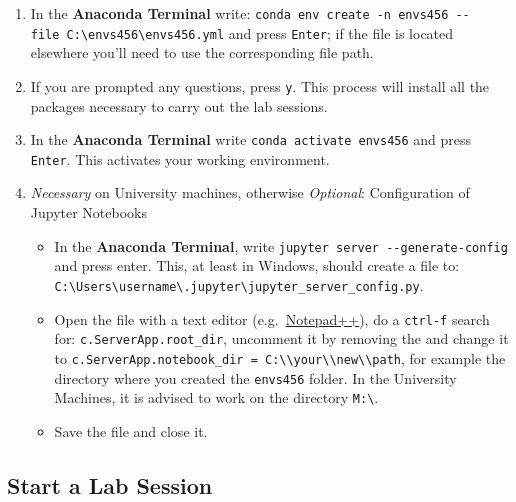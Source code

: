 \documentclass[
  letterpaper,
  DIV=11,
  numbers=noendperiod]{scrreprt}
\providecommand{\tightlist}{%
  \setlength{\itemsep}{0pt}\setlength{\parskip}{0pt}}\usepackage{longtable,booktabs,array}
\begin{document}
\begin{enumerate}
\def\labelenumi{\arabic{enumi}.}
\setcounter{enumi}{2}
\tightlist
\item
  In the \textbf{Anaconda Terminal} write:
  \texttt{conda\ env\ create\ -n\ envs456\ -\/-file\ C:\textbackslash{}envs456\textbackslash{}envs456.yml}
  and press \texttt{Enter}; if the file is located elsewhere you'll need
  to use the corresponding file path.
\item
  If you are prompted any questions, press \texttt{y}. This process will
  install all the packages necessary to carry out the lab sessions.
\item
  In the \textbf{Anaconda Terminal} write
  \texttt{conda\ activate\ envs456} and press \texttt{Enter}. This
  activates your working environment.
\item
  \emph{Necessary} on University machines, otherwise \emph{Optional}:
  Configuration of Jupyter Notebooks

  \begin{itemize}
  \tightlist
  \item
    In the \textbf{Anaconda Terminal}, write
    \texttt{jupyter\ server\ -\/-generate-config} and press enter. This,
    at least in Windows, should create a file to:
    \texttt{C:\textbackslash{}Users\textbackslash{}username\textbackslash{}.jupyter\textbackslash{}jupyter\_server\_config.py}.
  \item
    Open the file with a text editor
    (e.g.~\href{https://notepad-plus-plus.org}{Notepad++}), do a
    \texttt{ctrl-f} search for: \texttt{c.ServerApp.root\_dir},
    uncomment it by removing the and change it to
    \texttt{c.ServerApp.notebook\_dir\ =\ \textquotesingle{}C:\textbackslash{}\textbackslash{}your\textbackslash{}\textbackslash{}new\textbackslash{}\textbackslash{}path},
    for example the directory where you created the \texttt{envs456}
    folder. In the University Machines, it is advised to work on the
    directory \texttt{M:\textbackslash{}}.
  \item
    Save the file and close it.
  \end{itemize}
\end{enumerate}

\hypertarget{start-a-lab-session}{%
\subsection*{Start a Lab Session}\label{start-a-lab-session}}
\end{document}
